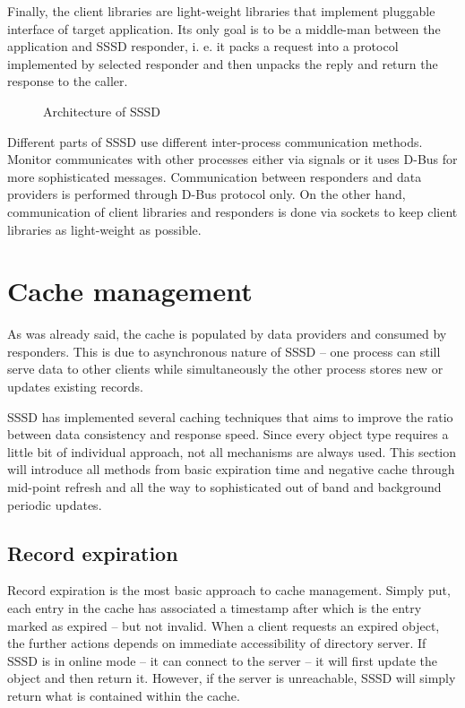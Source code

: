 
Finally, the client libraries are light-weight libraries that implement
pluggable interface of target application. Its only goal is to be a middle-man
between the application and SSSD responder, i. e. it packs a request into
a protocol implemented by selected responder and then unpacks the reply and
return the response to the caller.

\begin{figure}[H]
  \centering
  
  \caption{Architecture of SSSD}
  \label{fig:sssd-arch}
\end{figure}

Different parts of SSSD use different inter-process communication methods.
Monitor communicates with other processes either via signals or it uses D-Bus
for more sophisticated messages. Communication between responders and data
providers is performed through D-Bus protocol only. On the other hand,
communication of client libraries and responders is done via sockets to keep
client libraries as light-weight as possible.

\section{Cache management}
\label{sssd:cache}

As was already said, the cache is populated by data providers and consumed by
responders. This is due to asynchronous nature of SSSD -- one process can still
serve data to other clients while simultaneously the other process stores new or
updates existing records.

SSSD has implemented several caching techniques that aims to improve the ratio
between data consistency and response speed. Since every object type requires a
little bit of individual approach, not all mechanisms are always used. This
section will introduce all methods from basic expiration time and negative cache
through mid-point refresh and all the way to sophisticated out of band and
background periodic updates.

\subsection{Record expiration}
\label{sssd:cache:expiration}

Record expiration is the most basic approach to cache management. Simply put,
each entry in the cache has associated a timestamp after which is the entry
marked as expired -- but not invalid. When a client requests an expired object,
the further actions depends on immediate accessibility of directory server. If
SSSD is in online mode -- it can connect to the server -- it will first update
the object and then return it. However, if the server is unreachable, SSSD will
simply return what is contained within the cache.


